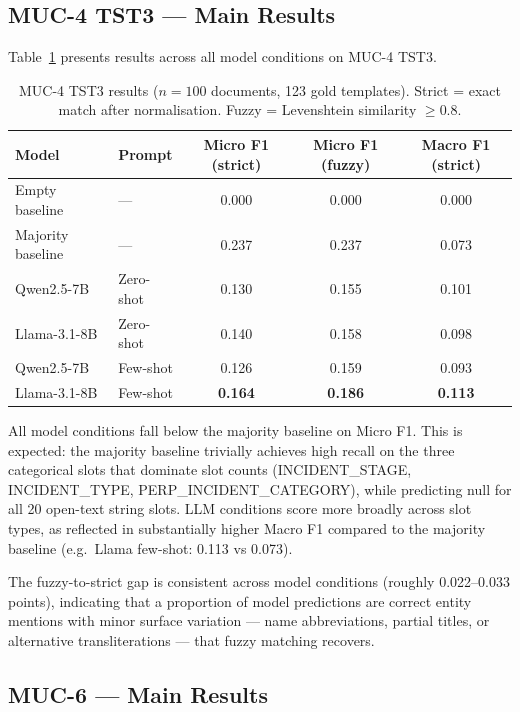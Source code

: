 \documentclass[11pt,a4paper]{article}
\begin{document}
\subsection{MUC-4 TST3 — Main Results}

Table~\ref{tab:muc4_results} presents results across all model conditions on MUC-4 TST3.

\begin{table}[h]
\centering
\caption{MUC-4 TST3 results ($n=100$ documents, 123 gold templates). Strict = exact match after normalisation. Fuzzy = Levenshtein similarity $\geq 0.8$.}
\label{tab:muc4_results}
\begin{tabular}{llccc}
\toprule
\textbf{Model} & \textbf{Prompt} & \textbf{Micro F1 (strict)} & \textbf{Micro F1 (fuzzy)} & \textbf{Macro F1 (strict)} \\
\midrule
Empty baseline    & —         & 0.000 & 0.000 & 0.000 \\
Majority baseline & —         & 0.237 & 0.237 & 0.073 \\
\midrule
Qwen2.5-7B        & Zero-shot & 0.130 & 0.155 & 0.101 \\
Llama-3.1-8B      & Zero-shot & 0.140 & 0.158 & 0.098 \\
Qwen2.5-7B        & Few-shot  & 0.126 & 0.159 & 0.093 \\
Llama-3.1-8B      & Few-shot  & \textbf{0.164} & \textbf{0.186} & \textbf{0.113} \\
\bottomrule
\end{tabular}
\end{table}

All model conditions fall below the majority baseline on Micro F1. This is expected: the majority baseline trivially achieves high recall on the three categorical slots that dominate slot counts (INCIDENT\_STAGE, INCIDENT\_TYPE, PERP\_INCIDENT\_CATEGORY), while predicting null for all 20 open-text string slots. LLM conditions score more broadly across slot types, as reflected in substantially higher Macro F1 compared to the majority baseline (e.g.\ Llama few-shot: 0.113 vs 0.073).

The fuzzy-to-strict gap is consistent across model conditions (roughly 0.022--0.033 points), indicating that a proportion of model predictions are correct entity mentions with minor surface variation — name abbreviations, partial titles, or alternative transliterations — that fuzzy matching recovers.

\subsection{MUC-6 — Main Results}
\end{document}
